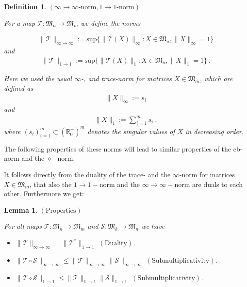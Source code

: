 \documentclass[a4paper
               ,12pt
               ,DIV=12
               ,oneside
               ]
               {amsart}
\theoremstyle{plain}
\newtheorem{lem}{Lemma}
\newtheorem{defn}{Definition}
\theoremstyle{remark}
\def\ra{\rightarrow}
\def\lb{\left(}
\def\rb{\right)}
\def\lset{\lbrace}
\def\rset{\rbrace}
\newcommand\R{\mathbb{R}}
\newcommand\M{\mathfrak{M}}
\newcommand{\Tm}{\mathcal{T}}
\newcommand{\Sm}{\mathcal{S}}
\newcommand{\Xst}{X}
\begin{document}
\begin{defn}$\lb\infty\ra\infty\text{-norm},1\ra 1\text{-norm}\rb$

For a map $\Tm :\M_n\ra \M_m$ we define the norms 

\begin{align*}
\| \Tm\|_{\infty\ra\infty} := \text{sup}\lset \| \Tm\lb\Xst\rb\|_{\infty}:\Xst\in\M_n,\|\Xst\|_\infty = 1\rset
\end{align*}
and
\begin{align*}
\| \Tm\|_{1\ra 1} := \text{sup}\lset \| \Tm\lb\Xst\rb\|_{1}:\Xst\in\M_n,\|\Xst\|_1 = 1\rset\medspace.
\end{align*}

Here we used the usual $\infty$-, and trace-norm for matrices $\Xst\in\M_m$, which are defined as
\begin{align*}
\| \Xst\|_{\infty} := s_1
\end{align*}
and
\begin{align*}
\| \Xst\|_{1} := \sum^{m}_{i=1} s_i\medspace,
\end{align*}
where $\lb s_i\rb^m_{i=1}\subset\lb\R_0^+\rb^m$ denotes the singular values of $\Xst$ in decreasing order.

\end{defn}

The following properties of these norms will lead to similar properties of the cb-norm and the $\diamond-$norm. 

It follows directly from the duality of the trace- and the $\infty$-norm for matrices $\Xst\in\M_m$, that also the $1\ra 1-$norm and the $\infty\ra\infty-$norm are duals to each other. Furthermore we get:  

\begin{lem}$\lb \text{Properties}\rb$

For all maps $\Tm :\M_n\ra\M_m$ and $\Sm:\M_k\ra\M_n$ we have

\begin{itemize}
\item $\| \Tm\|_{\infty\ra\infty} = \| \Tm^{*}\|_{1\ra 1}$ $\lb\text{Duality}\rb$.
\item $\| \Tm\circ \Sm\|_{\infty\ra\infty}\leq \| \Tm\|_{\infty\ra\infty}\| \Sm\|_{\infty\ra\infty}$ $\lb\text{Submultiplicativity}\rb$.
\item $\| \Tm\circ \Sm\|_{1\ra 1}\leq \| \Tm\|_{1\ra 1}\| \Sm\|_{1\ra 1}$ $\lb\text{Submultiplicativity}\rb$.
\end{itemize}

\end{lem}
\end{document}
